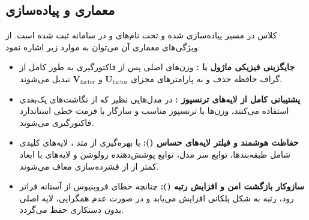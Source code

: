 \subsection{معماری و پیاده‌سازی}
کلاس  در مسیر  پیاده‌سازی شده و تحت نام‌های  و  در سامانه ثبت شده است. از ویژگی‌های معماری آن می‌توان به موارد زیر اشاره نمود:
\begin{itemize}
    \item \textbf{جایگزینی فیزیکی ماژول با :} وزن‌های اصلی پس از فاکتورگیری به طور کامل از گراف حافظه حذف و به پارامترهای مجزای $\mathbf{U}_{\text{factor}}$ و $\mathbf{V}_{\text{factor}}$ تبدیل می‌شوند.
    \item \textbf{پشتیبانی کامل از لایه‌های ترنسپوز :} در مدل‌هایی نظیر  که از نگاشت‌های یک‌بعدی استفاده می‌کنند، وزن‌ها با ترنسپوز مناسب و سازگار با فرمت خطی استاندارد فاکتورگیری می‌شوند.
    \item \textbf{حفاظت هوشمند و فیلتر لایه‌های حساس ():} با بهره‌گیری از متد ، لایه‌های کلیدی شامل طبقه‌بندها، توابع سر مدل، توابع پوشش‌دهنده رولوشن و لایه‌های با ابعاد کمتر از  از فشرده‌سازی معاف می‌شوند.
    \item \textbf{سازوکار بازگشت امن و افزایش رتبه ():} چنانچه خطای فروبنیوس از آستانه  فراتر رود، رتبه به شکل پلکانی افزایش می‌یابد و در صورت عدم همگرایی، لایه اصلی بدون دستکاری حفظ می‌گردد.
\end{itemize}

